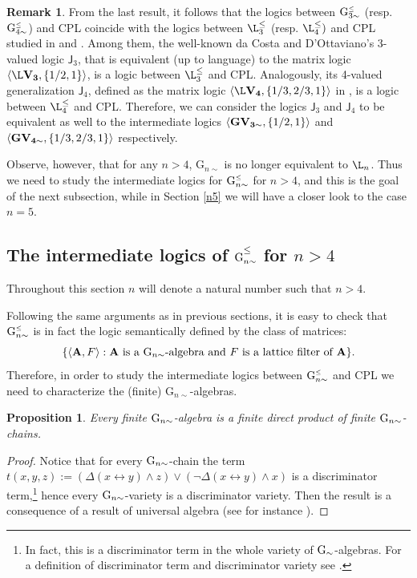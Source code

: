 \documentclass{article}
\newtheorem{proposition}{Proposition}
\theoremstyle{definition}
\newtheorem{remark}{Remark}
\newcommand{\Gnsimleq}{\mathrm{G}\mystrut^{\text{\tiny $\leq$}}_{n\sim}}
\newcommand{\Gasimleq}{\mathrm{G}\mystrut^{\text{\tiny $\leq$}}_{3\sim}}
\newcommand{\Gbsimleq}{\mathrm{G}\mystrut^{\text{\tiny $\leq$}}_{4\sim}}
\newcommand\mystrut{\rule{0pt}{7pt}}
\newcommand\mystrutsubsec{\rule{0pt}{10pt}}
\begin{document}
\begin{remark} \label{J34}
From the last result, it follows that the logics between $\Gasimleq$ (resp. $\Gbsimleq$) and  CPL coincide with the logics between $\L_{3 }^\leq$ (resp. $\L_{4 }^\leq)$ and  CPL studied in \cite{CoEsGo} and \cite{CoEsGiGo}. Among them, the well-known da Costa and D'Ottaviano's 3-valued logic $\mathsf{J}_3$, that is equivalent (up to language) to the matrix logic $\langle {\bf {\L}V_3}, \{1/2, 1\}\rangle$, is a logic between  $\L_{3 }^\leq$ and  CPL. Analogously, its 4-valued generalization  $\mathsf{J}_4$, defined as the matrix logic $\langle {\bf {\L}V_4}, \{1/3, 2/3, 1\}\rangle$ in \cite{CoEsGiGo}, is a logic between $\L_{4 }^\leq$  and CPL. Therefore, we can consider the logics $\mathsf{J}_3$ and $\mathsf{J}_4$ to be equivalent as well to the intermediate logics $\langle {\bf \bf GV_{3 \sim}}, \{1/2, 1\}\rangle$ and $\langle {\bf \bf GV_{4 \sim}}, \{1/3, 2/3, 1\}\rangle$ respectively.
\end{remark}


Observe, however, that for any $n > 4$, G$_{n \sim}$ is no longer equivalent to $\L_n$. Thus we need to study the intermediate logics for $\Gnsimleq$ for $n > 4$,  and this is the goal of the next subsection, while in Section \ref{n5} we will have a closer look to the case $n = 5$.


\subsection{The intermediate logics of $\mathrm{G}\mystrutsubsec^{\text{\footnotesize $\leq$}}_{n\sim}$  for $n> 4$} \label{Gn}

Throughout this section $n$ will denote a natural number such that $n > 4$.

Following the same arguments as in previous sections, it is easy to check that $\Gnsimleq$ is in fact the logic semantically defined by the class of matrices: 
$$\{\langle {\bf A}, F\rangle  : {\bf A} \mbox{ is a } {\rm G}_{n \sim}\mbox{-algebra and } F \mbox{ is a lattice filter of }{\bf A}\}.$$
Therefore, in order to study the intermediate logics between  $\Gnsimleq$ and CPL we need to characterize the (finite) G$_{n\sim}$-algebras.

\begin{proposition}
Every finite ${\rm G}_{n\sim}$-algebra is a finite direct product of finite ${\rm G}_{n\sim}$-chains.
\end{proposition}
\begin{proof}Notice that for every ${\rm G}_{n \sim}$-chain the term $t(x,y,z):= (\Delta(x\leftrightarrow y)\land z)\lor (\lnot\Delta(x\leftrightarrow y)\land x)$ is a discriminator term,\footnote{In fact, this is a discriminator term in the whole variety of ${\rm G}_{\sim}$-algebras. {For a definition of discriminator term and discriminator variety see \cite{bursan81}.}} hence every ${\rm G}_{n \sim}$-variety  is a discriminator variety. Then the result is a consequence of a result of universal algebra (see for instance \cite[Theorem 9.4, item (d)]{bursan81}).
\end{proof}
\end{document}
